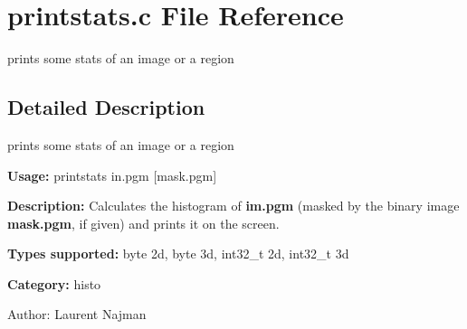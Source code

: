 \section{printstats.c File Reference}
\label{printstats_8c}
prints some stats of an image or a region 



\subsection{Detailed Description}
prints some stats of an image or a region 

{\bf Usage:} printstats in.pgm [mask.pgm]

{\bf Description:} Calculates the histogram of {\bf im.pgm} (masked by the binary image {\bf mask.pgm}, if given) and prints it on the screen.

{\bf Types supported:} byte 2d, byte 3d, int32\_\-t 2d, int32\_\-t 3d

{\bf Category:} histo

\begin{Desc}
\item[Author:]Laurent Najman \end{Desc}
